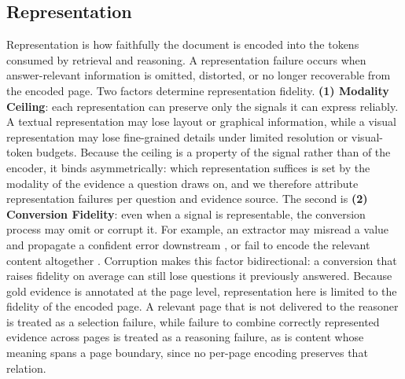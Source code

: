 \documentclass[11pt]{article}
\begin{document}
\subsection{Representation}
\label{subsec:fm_representation}
Representation is how faithfully the document is encoded into the tokens consumed by retrieval and reasoning.  
A representation failure occurs when answer-relevant information is omitted, distorted, or no longer recoverable from the encoded page. 
Two factors determine representation fidelity. 
\textbf{(1) Modality Ceiling}: each representation can preserve only the signals it can express reliably. 
A textual representation may lose layout or graphical information, while a visual representation may lose fine-grained details under limited resolution or visual-token budgets. 
Because the ceiling is a property of the signal rather than of the encoder, it binds asymmetrically: which representation suffices is set by the modality of the evidence a question draws on, and we therefore attribute representation failures per question and evidence source. 
The second is \textbf{(2) Conversion Fidelity}: even when a signal is representable, the conversion process may omit or corrupt it. 
For example, an extractor may misread a value and propagate a confident error downstream \citep{zhang2025ohrbench}, or fail to encode the relevant content altogether \citep{vanstrien2020assessingocr}. 
Corruption makes this factor bidirectional: a conversion that raises fidelity on average can still lose questions it previously answered. 
Because gold evidence is annotated at the page level, representation here is limited to the fidelity of the encoded page. 
A relevant page that is not delivered to the reasoner is treated as a selection failure, while failure to combine correctly represented evidence across pages is treated as a reasoning failure, as is content whose meaning spans a page boundary, since no per-page encoding preserves that relation.

\end{document}
